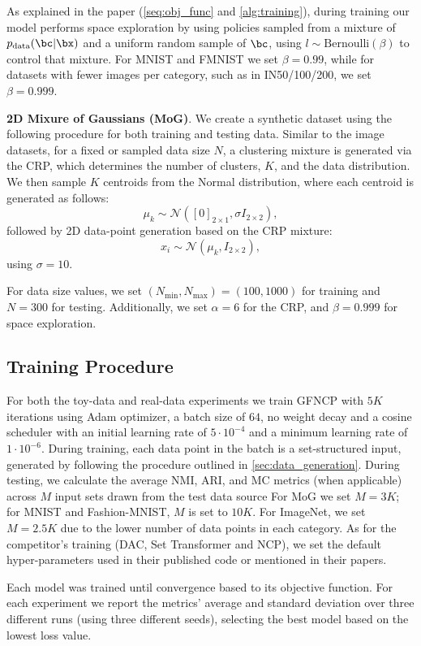 As explained in the paper (\autoref{seq:obj_func} and \autoref{alg:training}), during training our model performs space exploration by using policies sampled from a mixture of $p_{\text{data}}(\bc|\bx)$ and 
a uniform random sample of $\bc$,
using $l \sim \text{Bernoulli}(\beta)$ to control that mixture.
%
\noindent For MNIST and FMNIST we set $\beta=0.99$, while for datasets with fewer images per category, such as in IN50/100/200, we set $\beta=0.999$.
%

\textbf{2D Mixure of Gaussians (MoG)}. We create a synthetic dataset using the following procedure for both training and testing data. Similar to the image datasets, for a fixed or sampled data size $N$, a clustering mixture is generated via the CRP, which determines the number of clusters, $K$, and the data distribution. We then sample $K$ centroids from the Normal distribution, where each centroid is generated as follows: 
    \begin{equation}
        \mu_k \sim \mathcal{N}([0]_{2\times 1}, \sigma I_{2\times 2}),
    \end{equation}
followed by 2D data-point generation based on the CRP mixture: 
    \begin{equation}
        x_i \sim \mathcal{N}(\mu_k, I_{2\times 2}),
    \end{equation}
using $\sigma = 10$.

For data size values,
we set $(N_{\text{min}}, N_{\text{max}}) = (100, 1000)$ for training and $N=300$ for testing.
Additionally, we set $\alpha=6$ for the CRP, and $\beta=0.999$ for space exploration. 

\subsection{Training Procedure}
\label{sec:training_procedure}
For both the toy-data and real-data experiments we train GFNCP with $5K$ iterations using Adam optimizer, a batch size of $64$, no weight decay and a cosine scheduler with an initial learning rate of $5\cdot 10^{-4}$ and a minimum learning rate of $1\cdot 10^{-6}$.
During training, each data point in the batch is a set-structured input, generated by following the procedure outlined in \autoref{sec:data_generation}.
%
During testing, we calculate the average NMI, ARI, and MC metrics (when applicable) across $M$ input sets drawn from the test data source
%
For MoG we set $M=3K$; for MNIST and Fashion-MNIST, $M$ is set to $10K$. For ImageNet, we set $M=2.5K$ due to the lower number of data points in each category.
%
As for the competitor's training (DAC, Set Transformer and NCP), we set the default hyper-parameters used in their published code or mentioned in their papers.

Each model was trained until convergence based to its objective function.
%
For each experiment we report the metrics' average and standard deviation over three different runs (using three different seeds), 
selecting the best model based on the lowest loss value.

